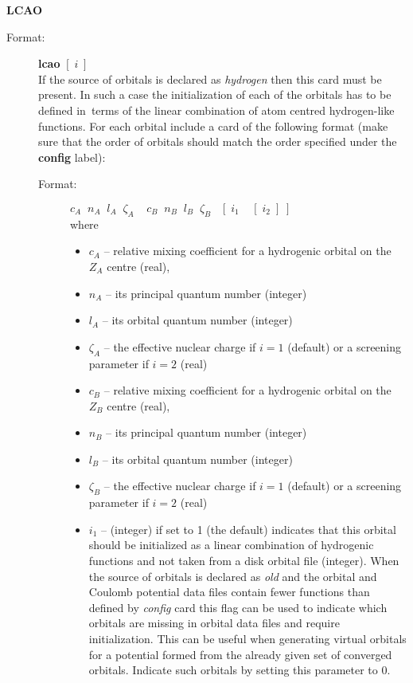\documentclass[10pt,a4paper]{article}
\begin{document}
\begin{description}
\item \textbf{LCAO}
\begin{description}
\item[Format:] \textbf{lcao} $[\;i\;]$\\ If the source of orbitals is
  declared as \textsl{hydrogen} then this card must be present. In such a
  case the initialization of each of the orbitals has to be defined
  in~terms of the linear combination of atom centred hydrogen-like
  functions. For each orbital include a card of the following format (make
  sure that the order of orbitals should match the order specified under
  the \textbf{config} label):

\begin{description}
\item[Format:] $c_A\;\;n_A \;\;l_A \;\;\zeta_A \;\;\;\;c_B\;\;n_B\;\;l_B\;\;
  \zeta_B\;\;\;[\;i_1\;\;\;\;[\;i_2\;]\;]$ \\
where
\begin{itemize}
\item[] $c_A$ -- relative mixing coefficient for a hydrogenic orbital on the
                    $Z_A$ centre (real),
\item[] $n_A$ -- its principal quantum number (integer)
\item[] $l_A$ -- its orbital quantum number (integer)
\item[] $\zeta_A$ -- the effective nuclear charge if $i=1$ (default) or
a screening parameter if $i=2$ (real)
\item[] $c_B$  -- relative mixing coefficient for a hydrogenic orbital on the
                    $Z_B$ centre (real),
\item[] $n_B$ -- its principal quantum number (integer)
\item[] $l_B$ -- its orbital quantum number (integer)
\item[] $\zeta_B$ -- the effective nuclear charge if $i=1$ (default) or
a screening parameter if $i=2$ (real)
\item[] $i_1$ -- (integer) if set to 1 (the default) indicates that this
  orbital should be initialized as a linear combination of hydrogenic
  functions and not taken from a disk orbital file (integer).
  When the source of orbitals is declared as \textsl{old} and the
  orbital and Coulomb potential data files contain fewer functions than
  defined by \textsl{config} card this flag can be used to indicate which
  orbitals are missing in orbital data files and require
  initialization. This can be useful when generating virtual orbitals for a
  potential formed from the already given set of converged orbitals. Indicate
  such orbitals by setting this parameter to 0.


\end{itemize}
\end{description}
\end{description}
\end{description}
\end{document}
